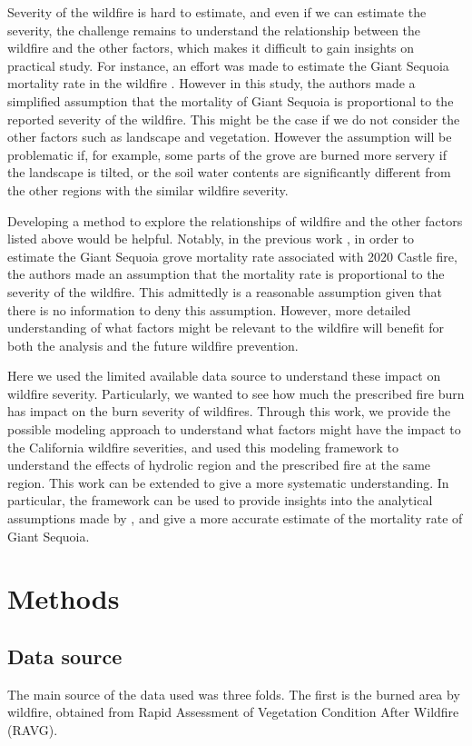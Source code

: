 \documentclass{article}
\begin{document}
Severity of the wildfire is hard to estimate, and even if we can estimate the severity, the challenge remains to understand the relationship between the wildfire and the other factors, which makes it difficult to gain insights on practical study. For instance, an effort was made to estimate the Giant Sequoia mortality rate in the wildfire \cite{stephenson2021preliminary}. However in this study, the authors made a simplified assumption that the mortality of Giant Sequoia is proportional to the reported severity of the wildfire. This might be the case if we do not consider the other factors such as landscape and vegetation. However the assumption will be problematic if, for example, some parts of the grove are burned more servery if the landscape is tilted, or the soil water contents are significantly different from the other regions with the similar wildfire severity. 


Developing a method to explore the relationships of wildfire and the other factors listed above would be helpful. Notably, in the previous work \cite{stephenson2021preliminary}, in order to estimate the Giant Sequoia grove mortality rate associated with 2020 Castle fire, the authors made an assumption that the mortality rate is proportional to the severity of the wildfire. This admittedly is a reasonable assumption given that there is no information to deny this assumption. However, more detailed understanding of what factors might be relevant to the wildfire will benefit for both the analysis and the future wildfire prevention. 

Here we used the limited available data source to understand these impact on wildfire severity. Particularly, we wanted to see how much the prescribed fire burn has impact on the burn severity of wildfires. Through this work, we provide the possible modeling approach to understand what factors might have the impact to the California wildfire severities, and used this modeling framework to understand the effects of hydrolic region and the prescribed fire at the same region. This work can be extended to give a more systematic understanding. In particular, the framework can be used to provide insights into the analytical assumptions made by \cite{stephenson2021preliminary}, and give a more accurate estimate of the mortality rate of Giant Sequoia. 


\section{Methods}
\subsection*{Data source}
The main source of the data used was three folds. The first is the burned area by wildfire, obtained from Rapid Assessment of Vegetation Condition After Wildfire (RAVG).
\end{document}
